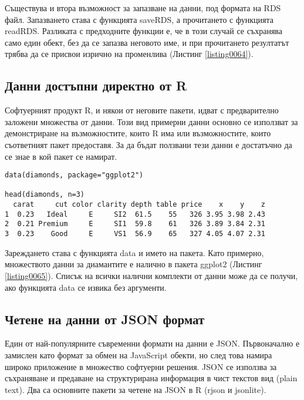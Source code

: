 Съществува и втора възможност за запазване на данни, под формата на RDS файл. Запазването става с функцията saveRDS, а прочитането с функцията readRDS. Разликата с предходните функции е, че в този случай се съхранява само един обект, без да се запазва неговото име, и при прочитането резултатът трябва да се присвои изрично на променлива (Листинг \ref{listing0064}). 

\subsection{Данни достъпни директно от R}

Софтуерният продукт R, и някои от неговите пакети, идват с предварително заложени множества от данни. Този вид примерни данни основно се използват за демонстриране на възможностите, които R има или възможностите, които съответният пакет предоставя. За да бъдат ползвани тези данни е достатъчно да се знае в кой пакет се намират.

\begin{lstlisting}[caption=Зареждане на примерни данни, label=listing0065]
data(diamonds, package="ggplot2")

head(diamonds, n=3)
  carat     cut color clarity depth table price    x    y    z
1  0.23   Ideal     E     SI2  61.5    55   326 3.95 3.98 2.43
2  0.21 Premium     E     SI1  59.8    61   326 3.89 3.84 2.31
3  0.23    Good     E     VS1  56.9    65   327 4.05 4.07 2.31
\end{lstlisting}

Зареждането става с функцията data и името на пакета. Като примерно, множеството данни за диамантите е налично в пакета ggplot2 (Листинг \ref{listing0065}). Списък на всички налични комплекти от данни може да се получи, ако функцията data се извика без аргументи. 

\subsection{Четене на данни от JSON формат}

Един от най-популярните съвременни формати на данни е JSON. Първоначално е замислен като формат за обмен на JavaScript обекти, но след това намира широко приложение в множество софтуерни решения. JSON се използва за съхраняване и предаване на структурирана информация в чист текстов вид (plain text). Два са основните пакети за четене на JSON в R (rjson и jsonlite).

